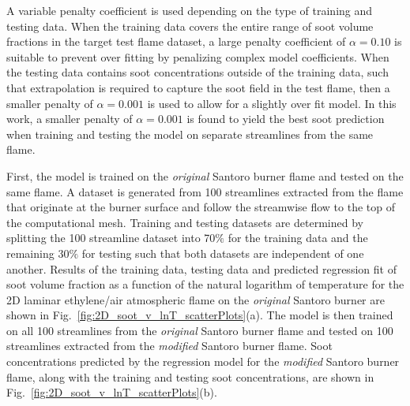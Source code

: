 \documentclass[12pt]{CHT-20}
\begin{document}
A variable penalty coefficient is used depending on the type of training and testing data. When the training data covers the entire range of soot volume fractions in the target test flame dataset, a large penalty coefficient of $\alpha=0.10$ is suitable to prevent over fitting by penalizing complex model coefficients. When the testing data contains soot concentrations outside of the training data, such that extrapolation is required to capture the soot field in the test flame, then a smaller penalty of $\alpha=0.001$ is used to allow for a slightly over fit model. In this work, a smaller penalty of $\alpha=0.001$ is found to yield the best soot prediction when training and testing the model on separate streamlines from the same flame.

First, the model is trained on the \emph{original} Santoro burner flame and tested on the same flame. A dataset is generated from 100 streamlines extracted from the flame that originate at the burner surface and follow the streamwise flow to the top of the computational mesh. Training and testing datasets are determined by splitting the 100 streamline dataset into 70$\%$ for the training data and the remaining 30$\%$ for testing such that both datasets are independent of one another. Results of the training data, testing data and predicted regression fit of soot volume fraction as a function of the natural logarithm of temperature for the 2D laminar ethylene/air atmospheric flame on the \emph{original} Santoro burner are shown in Fig.~\ref{fig:2D_soot_v_lnT_scatterPlots}(a). The model is then trained on all 100 streamlines from the \emph{original} Santoro burner flame and tested on 100 streamlines extracted from the \emph{modified} Santoro burner flame. Soot concentrations predicted by the regression model for the \emph{modified} Santoro burner flame, along with the training and testing soot concentrations, are shown in Fig.~\ref{fig:2D_soot_v_lnT_scatterPlots}(b).
\end{document}

